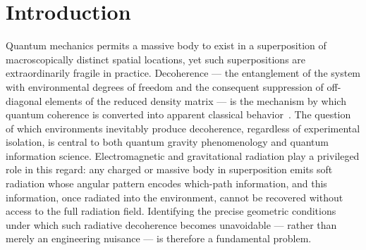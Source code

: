 
\section{Introduction}
\label{sec:intro}

Quantum mechanics permits a massive body to exist in a superposition of
macroscopically distinct spatial locations, yet such superpositions are
extraordinarily fragile in practice.  Decoherence — the entanglement of the
system with environmental degrees of freedom and the consequent suppression of
off-diagonal elements of the reduced density matrix — is the mechanism by which
quantum coherence is converted into apparent classical behavior~\cite{Zurek:2003,Joos:2003}.
The question of which environments inevitably produce decoherence, regardless of
experimental isolation, is central to both quantum gravity phenomenology and
quantum information science.  Electromagnetic and gravitational radiation play
a privileged role in this regard: any charged or massive body in superposition
emits soft radiation whose angular pattern encodes which-path information, and
this information, once radiated into the environment, cannot be recovered without
access to the full radiation field.  Identifying the precise geometric conditions
under which such radiative decoherence becomes unavoidable — rather than merely
an engineering nuisance — is therefore a fundamental problem.

